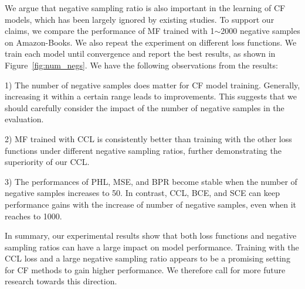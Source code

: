 \documentclass[sigconf,authorversion]{acmart}
\begin{document}
We argue that negative sampling ratio is also important in the learning of CF models, which has been largely ignored by existing studies. To support our claims, we compare the performance of MF trained with 1$\sim$2000 negative samples on Amazon-Books. We also repeat the experiment on different loss functions. We train each model until convergence and report the best results, as shown in Figure~\ref{fig:num_negs}. We have the following observations from the results:

1) The number of negative samples does matter for CF model training. Generally, increasing it within a certain range leads to improvements. This suggests that we should carefully consider the impact of the number of negative samples in the evaluation. 

2) MF trained with CCL is consistently better than training with the other loss functions under different negative sampling ratios, further demonstrating the superiority of our CCL.
    
3) The performances of PHL, MSE, and BPR become stable when the number of negative samples increases to 50. In contrast, CCL, BCE, and SCE can keep performance gains with the increase of number of negative samples, even when it reaches to 1000. 



In summary, our experimental results show that both loss functions and negative sampling ratios can have a large impact on model performance. Training with the CCL loss and a large negative sampling ratio appears to be a promising setting for CF methods to gain higher performance. We therefore call for more future research towards this direction. 
\end{document}
